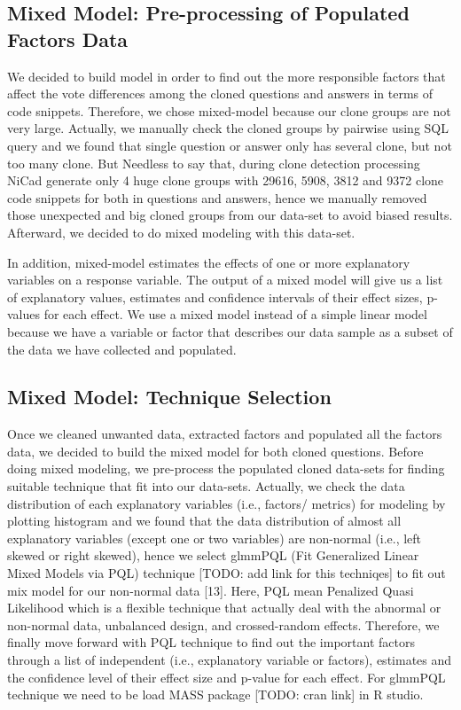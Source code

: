 \documentclass[conference]{IEEEtran}
\begin{document}
\subsection{Mixed Model: Pre-processing of Populated Factors Data}
We decided to build model in order to find out the more responsible factors that affect the vote differences among the cloned questions and answers in terms of code snippets. Therefore, we chose mixed-model because our clone groups are not very large. Actually, we manually check the cloned groups by pairwise using SQL query and we found that single question or answer only has several clone, but not too many clone. But Needless to say that, during clone detection processing NiCad generate only 4 huge clone groups with 29616, 5908, 3812 and 9372 clone code snippets for both in questions and answers, hence  we manually removed those unexpected and big cloned groups from our data-set to avoid biased results. Afterward, we decided to do mixed modeling with this data-set.

In addition,  mixed-model estimates the effects of one or more explanatory variables on a response variable. The output of a mixed model will give us a list of explanatory values, estimates and confidence intervals of their effect sizes, p-values for each effect. We use a mixed model instead of a simple linear model because we have a variable or factor that describes our data sample as a subset of the data we have collected and populated.  

\subsection{Mixed Model: Technique Selection}
Once we cleaned unwanted data, extracted factors and populated all the factors data, we decided to build the mixed model for both cloned questions. Before doing mixed modeling, we pre-process the populated cloned  data-sets for finding suitable technique that fit into our data-sets. Actually, we check the data distribution of each explanatory variables (i.e., factors/ metrics) for modeling by plotting histogram and we found that the data distribution of almost all explanatory variables (except one or two variables) are non-normal (i.e., left skewed or right skewed), hence we select glmmPQL (Fit Generalized Linear Mixed Models via PQL) technique [TODO: add link for this techniqes] to fit out mix model for our non-normal data [13].  Here, PQL mean Penalized Quasi Likelihood which is a flexible technique that actually deal with the abnormal or non-normal data, unbalanced design, and crossed-random effects. Therefore, we finally move forward with PQL technique to find out the important factors through a list of independent (i.e., explanatory variable or factors), estimates and the confidence level of their effect size and p-value for each effect. For glmmPQL technique we need to be load MASS package [TODO: cran link] in R studio.
\end{document}
